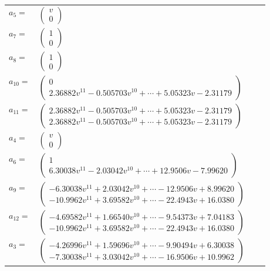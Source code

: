 \documentclass[1p]{elsarticle_modified}
\theoremstyle{definition}
\begin{document}
\begin{tabular}{m{7pt} m{180pt} m{7pt} m{180pt} }
\flushright $a_{5}=$&$\begin{pmatrix}v\\0\end{pmatrix}$ \\
\flushright $a_{7}=$&$\begin{pmatrix}1\\0\end{pmatrix}$ \\
\flushright $a_{8}=$&$\begin{pmatrix}1\\0\end{pmatrix}$ \\
\flushright $a_{10}=$&$\begin{pmatrix}0\\2.36882 v^{11}-0.505703 v^{10}+\cdots+5.05323 v-2.31179\end{pmatrix}$ \\
\flushright $a_{11}=$&$\begin{pmatrix}2.36882 v^{11}-0.505703 v^{10}+\cdots+5.05323 v-2.31179\\2.36882 v^{11}-0.505703 v^{10}+\cdots+5.05323 v-2.31179\end{pmatrix}$ \\
\flushright $a_{4}=$&$\begin{pmatrix}v\\0\end{pmatrix}$ \\
\flushright $a_{6}=$&$\begin{pmatrix}1\\6.30038 v^{11}-2.03042 v^{10}+\cdots+12.9506 v-7.99620\end{pmatrix}$ \\
\flushright $a_{9}=$&$\begin{pmatrix}-6.30038 v^{11}+2.03042 v^{10}+\cdots-12.9506 v+8.99620\\-10.9962 v^{11}+3.69582 v^{10}+\cdots-22.4943 v+16.0380\end{pmatrix}$ \\
\flushright $a_{12}=$&$\begin{pmatrix}-4.69582 v^{11}+1.66540 v^{10}+\cdots-9.54373 v+7.04183\\-10.9962 v^{11}+3.69582 v^{10}+\cdots-22.4943 v+16.0380\end{pmatrix}$ \\
\flushright $a_{3}=$&$\begin{pmatrix}-4.26996 v^{11}+1.59696 v^{10}+\cdots-9.90494 v+6.30038\\-7.30038 v^{11}+3.03042 v^{10}+\cdots-16.9506 v+10.9962\end{pmatrix}$ \\

\end{tabular}
\end{document}
